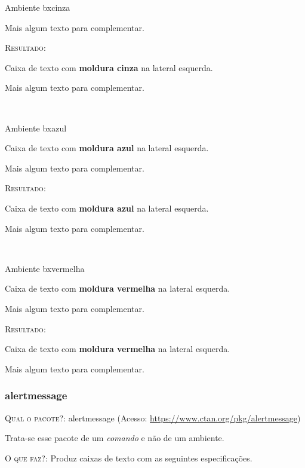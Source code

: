 \documentclass[a4paper,12pt,oneside,openright,extrafontsizes,openbib]{memoir}
\begin{document}
{\begin{codex}{Ambiente bxcinza}
\begin{bxcinza}
	Mais algum texto para complementar.  
	\end{bxcinza}
\end{codex}

\textsc{Resultado:}
\begin{bxcinza}
	Caixa de texto com \textbf{moldura cinza} na lateral esquerda. 
	
	Mais algum texto para complementar.  
\end{bxcinza}
\ \\

\begin{codex}{Ambiente bxazul}
	\begin{bxazul}
	Caixa de texto com \textbf{moldura azul} na lateral esquerda. 
	
	Mais algum texto para complementar.  
	\end{bxazul}
\end{codex}

 \textsc{Resultado:}
\begin{bxazul}
	Caixa de texto com \textbf{moldura azul} na lateral esquerda. 
	
	Mais algum texto para complementar.  
\end{bxazul}
\ \\

\begin{codex}{Ambiente bxvermelha}
	\begin{bxvermelha}
	Caixa de texto com \textbf{moldura vermelha} na lateral esquerda. 
		
	Mais algum texto para complementar.  
	\end{bxvermelha}
\end{codex}

\textsc{Resultado:}
\begin{bxvermelha}
	Caixa de texto com \textbf{moldura vermelha} na lateral esquerda. 
	
	Mais algum texto para complementar.  
\end{bxvermelha}


\subsubsection{alertmessage}

\textsc{Qual o pacote?}: alertmessage (Acesso: \url{https://www.ctan.org/pkg/alertmessage})

Trata-se esse pacote de um \textit{comando} e não de um ambiente.

\textsc{O que faz?}: Produz caixas de texto com as seguintes especificações.

}
\end{document}
